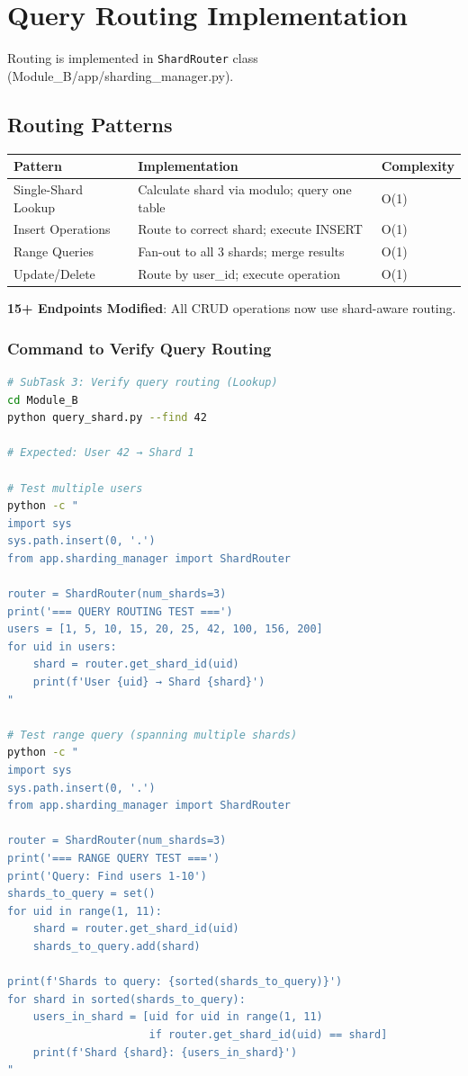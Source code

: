 \documentclass[11pt,a4paper]{article}
\begin{document}
\section{Query Routing Implementation}

Routing is implemented in \texttt{ShardRouter} class (Module\_B/app/sharding\_manager.py).

\subsection*{Routing Patterns}

\begin{tabular}{|p{3cm}|p{5.5cm}|p{2cm}|}
\hline
\textbf{Pattern} & \textbf{Implementation} & \textbf{Complexity} \\
\hline
Single-Shard Lookup & Calculate shard via modulo; query one table & O(1) \\
Insert Operations & Route to correct shard; execute INSERT & O(1) \\
Range Queries & Fan-out to all 3 shards; merge results & O(1) \\
Update/Delete & Route by user\_id; execute operation & O(1) \\
\hline
\end{tabular}

\textbf{15+ Endpoints Modified}: All CRUD operations now use shard-aware routing.

\subsubsection*{Command to Verify Query Routing}

\begin{lstlisting}[language=bash]
# SubTask 3: Verify query routing (Lookup)
cd Module_B
python query_shard.py --find 42

# Expected: User 42 → Shard 1

# Test multiple users
python -c "
import sys
sys.path.insert(0, '.')
from app.sharding_manager import ShardRouter

router = ShardRouter(num_shards=3)
print('=== QUERY ROUTING TEST ===')
users = [1, 5, 10, 15, 20, 25, 42, 100, 156, 200]
for uid in users:
    shard = router.get_shard_id(uid)
    print(f'User {uid} → Shard {shard}')
"

# Test range query (spanning multiple shards)
python -c "
import sys
sys.path.insert(0, '.')
from app.sharding_manager import ShardRouter

router = ShardRouter(num_shards=3)
print('=== RANGE QUERY TEST ===')
print('Query: Find users 1-10')
shards_to_query = set()
for uid in range(1, 11):
    shard = router.get_shard_id(uid)
    shards_to_query.add(shard)

print(f'Shards to query: {sorted(shards_to_query)}')
for shard in sorted(shards_to_query):
    users_in_shard = [uid for uid in range(1, 11) 
                      if router.get_shard_id(uid) == shard]
    print(f'Shard {shard}: {users_in_shard}')
"
\end{lstlisting}
\end{document}
